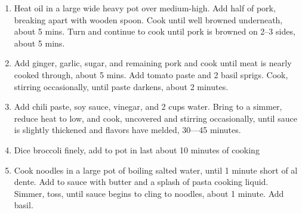\documentclass[]{report}
\begin{document}
            {\begin{enumerate}
                  \item  Heat oil in a large wide heavy pot over medium-high. Add half of pork, breaking apart with wooden spoon. Cook until well browned underneath, about 5 mins. Turn and continue to cook until pork is browned on 2--3 sides, about 5 mins.
                  \item Add ginger, garlic, sugar, and remaining pork and cook until meat is nearly cooked through, about 5 mins. Add tomato paste and 2 basil sprigs. Cook, stirring  occasionally, until paste darkens, about 2 minutes.
                  \item Add chili paste, soy sauce, vinegar, and 2 cups water. Bring to a simmer, reduce heat to low, and cook, uncovered and stirring occasionally, until sauce is slightly thickened and flavors have melded, 30—45 minutes.
                  \item Dice broccoli finely, add to pot in last about 10 minutes of cooking
                  \item Cook noodles in a large pot of boiling salted water, until 1 minute short of al dente. Add to sauce with butter and a splash of pasta cooking liquid. Simmer, toss, until sauce begins to cling to noodles, about 1 minute. Add basil.
            \end{enumerate}}
            
\end{document}
